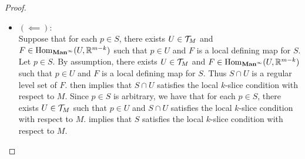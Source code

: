 \documentclass{book}
\begin{document}
\begin{proof}
\begin{itemize}
			Hence $F^{-1}(\{0\}) = S \cap U$. Let $q \in S \cap U$.  implies that $[D \phi (q)]_{\phi, \id_{\R^m}} = 
			\begin{pmatrix}
				[D \pi^m_{[k]} \circ \phi (q) ]_{\phi, \id_{\R^k}} \\
				[DF(q)]_{\phi, \id_{\R^r}}. 
			\end{pmatrix}
			$ 
			Since $[D \phi (q)]_{\phi, \id_{\R^m}}$ is a bijection, we have that $\rnk [DF(q)]_{\phi, \id_{\R^r}} = r$. Thus $DF(q)$ is surjective. Since $q \in S \cap U$ is arbitrary, we have that for each $q \in U$, $DF(q)$ is surjective. Thus $0 \in \R^r$ is a regular value of $F$ and $S \cap U$ is a regular level set of $F$. Hence $F$ is a local defining map for $S \cap U$.
			\item $(\impliedby):$ \\
			Suppose that for each $p \in S$, there exists $U \in \mathcal{T}_M$ and $F \in \operatorname{Hom}_{\operatorname*{\text{\textbf{Man}}^{\infty}}}(U, \mathbb{R}^{m-k})$ such that $p \in U$ and $F$ is a local defining map for $S$. Let $p \in S$. By assumption, there exists $U \in \mathcal{T}_M$ and $F \in \operatorname{Hom}_{\operatorname*{\text{\textbf{Man}}^{\infty}}}(U, \mathbb{R}^{m-k})$ such that $p \in U$ and  $F$ is a local defining map for $S$. Thus $S \cap U$ is a regular level set of $F$.  then implies that $S \cap U$ satisfies the local $k$-slice condition with respect to $M$. Since $p \in S$ is arbitrary, we have that for each $p \in S$, there exists $U \in \mathcal{T}_M$ such that $p \in U$ and $S \cap U$ satisfies the local $k$-slice condition with respect to $M$.  \rex{} implies that $S$ satisfies the local $k$-slice condition with respect to $M$.
		\end{itemize}
	\end{proof}
	
	
	

	
	
	
	
	
	
	
	
	
	
	
	
	
	
	
	
	
	
	
	
	
	
	
	
	
	
\end{document}
